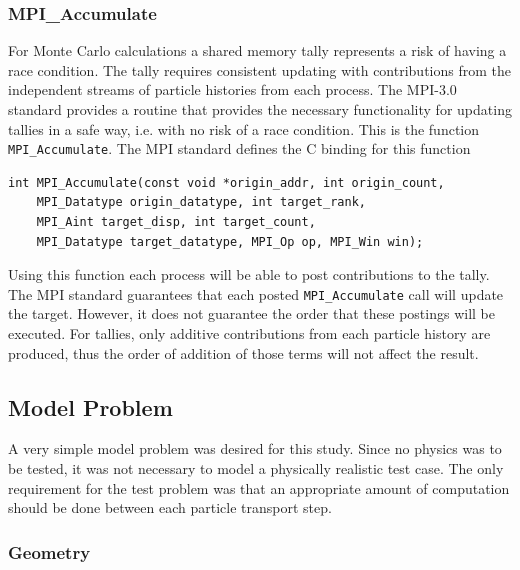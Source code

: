 \documentclass{mc2015}
\begin{document}
\subsubsection{MPI\_Accumulate}

For Monte Carlo calculations a shared memory tally represents
a risk of having a race condition.
The tally requires consistent updating with contributions from
the independent streams of particle histories from each process.
The MPI-3.0 standard provides a routine that provides
the necessary functionality for updating tallies in a safe way,
i.e. with no risk of a race condition.
This is the function \lstinline$MPI_Accumulate$.
The MPI standard defines the C binding for this function\cite{MPIbook}
\begin{lstlisting}
int MPI_Accumulate(const void *origin_addr, int origin_count,
    MPI_Datatype origin_datatype, int target_rank,
    MPI_Aint target_disp, int target_count,
    MPI_Datatype target_datatype, MPI_Op op, MPI_Win win);
\end{lstlisting}
Using this function each process will be able to post contributions to the tally.
The MPI standard guarantees that each posted \lstinline$MPI_Accumulate$ call
will update the target.
However, it does not guarantee the order that these postings will be executed.
For tallies, only additive contributions from each particle history are produced,
thus the order of addition of those terms will not affect the result.

\subsection{Model Problem}

A very simple model problem was desired for this study.
Since no physics was to be tested, it was not necessary to model a
physically realistic test case.
The only requirement for the test problem was that an appropriate amount
of computation should be done between each particle transport step.

\subsubsection{Geometry}
\end{document}
